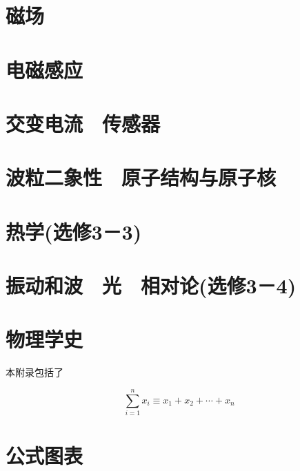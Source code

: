 \documentclass[cn,11pt]{elegantbook}
\begin{document}
\chapter{磁场}
\chapter{电磁感应}
\chapter{交变电流　传感器}
\chapter{波粒二象性　原子结构与原子核}
\chapter{热学(选修3－3)}
\chapter{振动和波　光　相对论(选修3－4)}

\nocite{*} 



\appendix
\chapter{物理学史}

本附录包括了

\begin{equation}
\sum_{i=1}^n x_i \equiv x_1 + x_2 +\cdots + x_n
\end{equation}



\chapter{公式图表}
\end{document}
